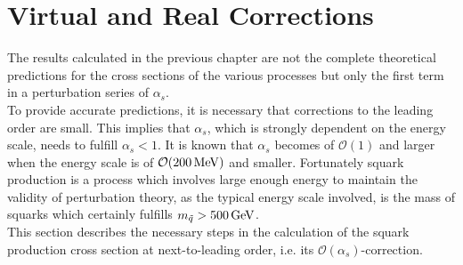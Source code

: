 \section{Virtual and Real Corrections}\label{sec:VirtRealCorr}
The results calculated in the previous chapter are not the complete theoretical predictions for the cross sections of the various processes but only the first term in a perturbation series of $\alpha_s$.\\
To provide accurate predictions, it is necessary that corrections to the leading order are small. This implies that $\alpha_s$, which is strongly dependent on the energy scale, needs to fulfill $\alpha_s < 1$. It is known that $\alpha_s$ becomes of $\mathcal{O}(1)$ and larger when the energy scale is of $\mathcal{O}(\unit[200]{MeV})$ and smaller\cite{dissertori2003quantum}. Fortunately squark production is a process which involves large enough energy to maintain the validity of perturbation theory, as the typical energy scale involved, is the mass of squarks which certainly fulfills $m_{\tilde{q}} > \unit[500]{GeV}$.\\
This section describes the necessary steps in the calculation of the squark production cross section at next-to-leading order, i.e. its $\mathcal{O}(\alpha_s)$-correction.\\


